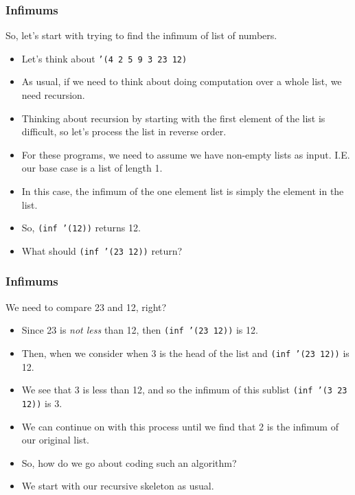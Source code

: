 \documentclass{beamer}
\begin{document}
\begin{frame}
  \frametitle{Infimums}
  So, let's start with trying to find the infimum of list of numbers.
  \begin{itemize}
  \item<2-> Let's think about \texttt{'(4 2 5 9 3 23 12)}
  \item<3-> As usual, if we need to think about doing computation over a whole
    list, we need recursion.
  \item<4-> Thinking about recursion by starting with the first element
    of the list is difficult, so let's process the list in reverse order.
  \item<5-> For these programs, we need to assume we have non-empty lists
    as input. I.E. our base case is a list of length 1.
  \item<6-> In this case, the infimum of the one element list is simply
    the element in the list.
  \item<7-> So, \texttt{(inf '(12))} returns 12.
  \item<8-> What should \texttt{(inf '(23 12))} return?
  \end{itemize}
\end{frame}

\begin{frame}
  \frametitle{Infimums}
  We need to compare 23 and 12, right?
  \begin{itemize}
  \item<2-> Since 23 is \emph{not less} than 12, then
    \texttt{(inf '(23 12))} is 12.
  \item<3-> Then, when we consider when 3 is the head of the list
    and \texttt{(inf '(23 12))} is 12.
  \item<4-> We see that 3 is less than 12, and so the infimum of this sublist
    \texttt{(inf '(3 23 12))} is 3.
  \item<5-> We can continue on with this process until we find that 2 is
    the infimum of our original list.
  \item<6-> So, how do we go about coding such an algorithm?
  \item<7-> We start with our recursive skeleton as usual.
  \end{itemize}
\end{frame}

\end{document}

